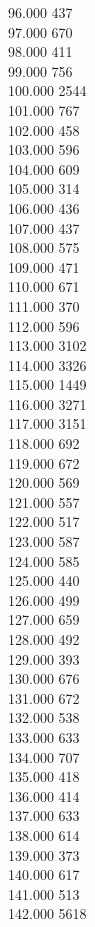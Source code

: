 { 96.000	437 \\
 97.000	670 \\
 98.000	411 \\
 99.000	756 \\
 100.000	2544 \\
 101.000	767 \\
 102.000	458 \\
 103.000	596 \\
 104.000	609 \\
 105.000	314 \\
 106.000	436 \\
 107.000	437 \\
 108.000	575 \\
 109.000	471 \\
 110.000	671 \\
 111.000	370 \\
 112.000	596 \\
 113.000	3102 \\
 114.000	3326 \\
 115.000	1449 \\
 116.000	3271 \\
 117.000	3151 \\
 118.000	692 \\
 119.000	672 \\
 120.000	569 \\
 121.000	557 \\
 122.000	517 \\
 123.000	587 \\
 124.000	585 \\
 125.000	440 \\
 126.000	499 \\
 127.000	659 \\
 128.000	492 \\
 129.000	393 \\
 130.000	676 \\
 131.000	672 \\
 132.000	538 \\
 133.000	633 \\
 134.000	707 \\
 135.000	418 \\
 136.000	414 \\
 137.000	633 \\
 138.000	614 \\
 139.000	373 \\
 140.000	617 \\
 141.000	513 \\
 142.000	5618 \\
}

